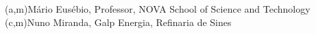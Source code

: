 %
%
%
%
(a,m){Mário Eusébio, Professor, NOVA School of Science and Technology}
(c,m){Nuno Miranda, Galp Energia, Refinaria de Sines}  %



%
%
%
%
